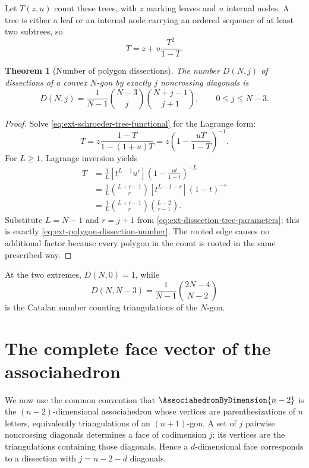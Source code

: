 \documentclass[11pt,a4paper,oneside,openany]{book}
\newtheorem{theorem}{Theorem}[chapter]
\theoremstyle{definition}
\theoremstyle{remark}
\begin{document}
Let \(T(z,u)\) count these trees, with \(z\) marking leaves and \(u\) internal
nodes.  A tree is either a leaf or an internal node carrying an ordered sequence
of at least two subtrees, so
\begin{equation}\label{eq:ext-schroeder-tree-functional}
 T=z+u\frac{T^2}{1-T}.
\end{equation}

\begin{theorem}[Number of polygon dissections]
\label{thm:ext-polygon-dissections}
The number \(D(N,j)\) of dissections of a convex \(N\)-gon by exactly \(j\)
noncrossing diagonals is
\begin{equation}\label{eq:ext-polygon-dissection-number}
 D(N,j)=\frac1{N-1}\binom{N-3}{j}\binom{N+j-1}{j+1},
 \qquad 0\le j\le N-3.
\end{equation}
\end{theorem}
\begin{proof}
Solve \eqref{eq:ext-schroeder-tree-functional} for the Lagrange form:
\[
 T=z\frac{1-T}{1-(1+u)T}
   =z\left(1-\frac{uT}{1-T}\right)^{-1}.
\]
For \(L\ge1\), Lagrange inversion yields
\begin{align*}
 [z^Lu^r]T
 &=\frac1L[t^{L-1}u^r]
   \left(1-\frac{ut}{1-t}\right)^{-L}\\
 &=\frac1L\binom{L+r-1}{r}
   [t^{L-1-r}](1-t)^{-r}\\
 &=\frac1L\binom{L+r-1}{r}\binom{L-2}{r-1}.
\end{align*}
Substitute \(L=N-1\) and \(r=j+1\) from
\eqref{eq:ext-dissection-tree-parameters}; this is exactly
\eqref{eq:ext-polygon-dissection-number}.  The rooted edge causes no additional
factor because every polygon in the count is rooted in the same prescribed way.
\end{proof}

At the two extremes, \(D(N,0)=1\), while
\[
 D(N,N-3)=\frac1{N-1}\binom{2N-4}{N-2}
\]
is the Catalan number counting triangulations of the \(N\)-gon.

\section{The complete face vector of the associahedron}

We now use the common convention that \(\AssociahedronByDimension{n-2}\) is the \((n-2)\)-dimensional
associahedron whose vertices are parenthesizations of \(n\) letters, equivalently
triangulations of an \((n+1)\)-gon.  A set of \(j\) pairwise noncrossing
diagonals determines a face of codimension \(j\): its vertices are the
triangulations containing those diagonals.  Hence a \(d\)-dimensional face
corresponds to a dissection with
\(j=n-2-d\) diagonals.
\end{document}

